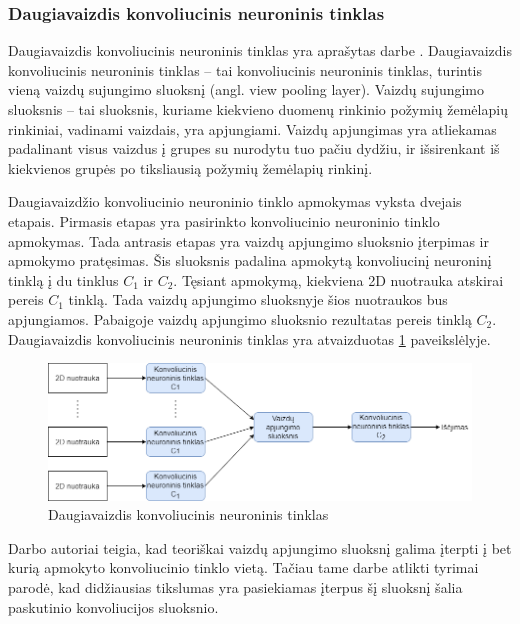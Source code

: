 \subsubsection{Daugiavaizdis konvoliucinis neuroninis tinklas}

Daugiavaizdis konvoliucinis neuroninis tinklas yra aprašytas darbe \cite{cnnExp1}. Daugiavaizdis konvoliucinis neuroninis tinklas -- tai konvoliucinis neuroninis tinklas, turintis vieną vaizdų sujungimo sluoksnį (angl. view pooling layer). Vaizdų sujungimo sluoksnis -- tai sluoksnis, kuriame kiekvieno duomenų rinkinio požymių žemėlapių rinkiniai, vadinami vaizdais, yra apjungiami. Vaizdų apjungimas yra atliekamas padalinant visus vaizdus į grupes su nurodytu tuo pačiu dydžiu, ir išsirenkant iš kiekvienos grupės po tiksliausią požymių žemėlapių rinkinį.

Daugiavaizdžio konvoliucinio neuroninio tinklo apmokymas vyksta dvejais etapais. Pirmasis etapas yra pasirinkto konvoliucinio neuroninio tinklo apmokymas. Tada antrasis etapas yra vaizdų apjungimo sluoksnio įterpimas ir apmokymo pratęsimas. Šis sluoksnis padalina apmokytą konvoliucinį neuroninį tinklą į du tinklus $C_1$ ir $C_2$. Tęsiant apmokymą, kiekviena 2D nuotrauka atskirai pereis $C_1$ tinklą. Tada vaizdų apjungimo sluoksnyje šios nuotraukos bus apjungiamos. Pabaigoje vaizdų apjungimo sluoksnio rezultatas pereis tinklą $C_2$. Daugiavaizdis konvoliucinis neuroninis tinklas yra atvaizduotas \ref{img:mvcnn} paveikslėlyje.

\begin{figure}[H]
	\centering
	\includegraphics[scale=0.5]{img/mvcnn.png}
	\caption{Daugiavaizdis konvoliucinis neuroninis tinklas}
	\label{img:mvcnn}
\end{figure}

Darbo \cite{cnnExp1} autoriai teigia, kad teoriškai vaizdų apjungimo sluoksnį galima įterpti į bet kurią apmokyto konvoliucinio tinklo vietą. Tačiau tame darbe atlikti tyrimai parodė, kad didžiausias tikslumas yra pasiekiamas įterpus šį sluoksnį šalia paskutinio konvoliucijos sluoksnio.

